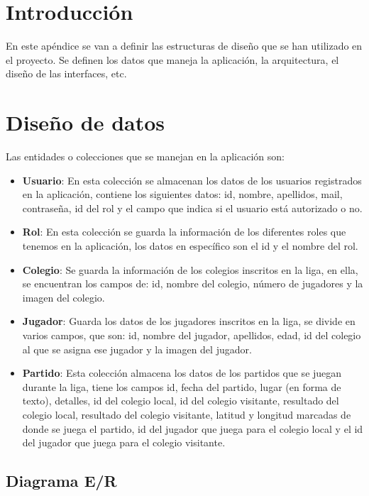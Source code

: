 
\section{Introducción}

En este apéndice se van a definir las estructuras de diseño que se han utilizado en el proyecto. Se definen los datos que maneja la aplicación, la arquitectura, el diseño de las interfaces, etc.

\section{Diseño de datos}

Las entidades o colecciones que se manejan en la aplicación son:

\begin{itemize}
\tightlist
\item
  \textbf{Usuario}: En esta colección se almacenan los datos de los usuarios registrados en la aplicación, contiene los siguientes datos: id, nombre, apellidos, mail, contraseña, id del rol y el campo que indica si el usuario está autorizado o no.
\item
  \textbf{Rol}: En esta colección se guarda la información de los diferentes roles que tenemos en la aplicación, los datos en específico son el id y el nombre del rol.
\item
  \textbf{Colegio}: Se guarda la información de los colegios inscritos en la liga, en ella, se encuentran los campos de: id, nombre del colegio, número de jugadores y la imagen del colegio.
\item
  \textbf{Jugador}: Guarda los datos de los jugadores inscritos en la liga, se divide en varios campos, que son: id, nombre del jugador, apellidos, edad, id del colegio al que se asigna ese jugador y la imagen del jugador.
\item
  \textbf{Partido}: Esta colección almacena los datos de los partidos que se juegan durante la liga, tiene los campos id, fecha del partido, lugar (en forma de texto), detalles, id del colegio local, id del colegio visitante, resultado del colegio local, resultado del colegio visitante, latitud y longitud marcadas de donde se juega el partido, id del jugador que juega para el colegio local y el id del jugador que juega para el colegio visitante.
\end{itemize}

\subsection{Diagrama E/R}

